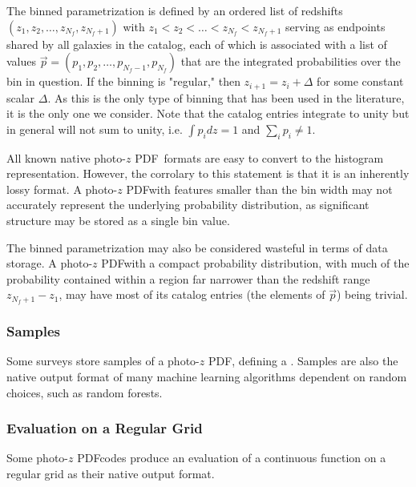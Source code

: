 \documentclass[\docopts]{\docclass}
\newcommand{\pz}{photo-$z$ PDF}
\begin{document}
The binned parametrization is defined by an ordered list of redshifts $(z_{1}, 
z_{2}, \dots, z_{N_{f}}, z_{N_{f}+1})$ with $z_{1} < z_{2} < \dots < z_{N_{f}} 
< z_{N_{f}+1}$ serving as endpoints shared by all galaxies in the catalog, each 
of which is associated with a list of values $\vec{p} = (p_{1}, p_{2}, \dots, 
p_{N_{f}-1}, p_{N_{f}})$ that are the integrated probabilities over the bin in 
question.  If the binning is "regular," then $z_{i+1}=z_{i}+\Delta$ for some 
constant scalar $\Delta$.  As this is the only type of binning that has been 
used in the literature, it is the only one we consider.  Note that the catalog 
entries integrate to unity but in general will not sum to unity, i.e. $\int 
p_{i} dz = 1$ and $\sum_{i}p_{i}\neq1$.

All known native \pz\ formats are easy to convert to the histogram 
representation.  However, the corrolary to this statement is that it is an 
inherently lossy format.  A \pz with features smaller than the bin width may 
not accurately represent the underlying probability distribution, as 
significant structure may be stored as a single bin value.

The binned parametrization may also be considered wasteful in terms of data 
storage.  A \pz  with a compact probability distribution, with much of the 
probability contained within a region far narrower than the redshift range 
$z_{N_{f}+1} - z_{1}$, may have most of its catalog entries (the elements of 
$\vec{p}$) being trivial.  

\subsubsection{Samples}
\label{sec:samples}

Some surveys store samples of a \pz, defining a .    Samples are also the native output format of many machine learning 
algorithms dependent on random choices, such as random forests.

\subsubsection{Evaluation on a Regular Grid}
\label{sec:grid}

Some \pz  codes produce an evaluation of a continuous function on a regular 
grid as their native output format.  
\end{document}
